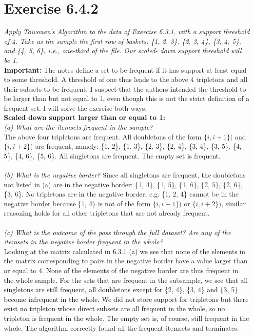 \documentclass{article}
\begin{document}
\section*{Exercise 6.4.2}
\textit{Apply Toivonen’s Algorithm to the data of Exercise 6.3.1,
with a support threshold of 4. Take as the sample the first row of baskets:
\{1, 2, 3\}, \{2, 3, 4\}, \{3, 4, 5\}, and \{4, 5, 6\}, i.e., one-third of the file. Our scaled-
down support threshold will be 1.}
\\
\textbf{Important:} The notes define a set to be frequent if it has support at least equal to some threshold. A threshold of one thus leads to the above 4 tripletons and all their subsets to be frequent.
I suspect that the authors intended the threshold to be larger than but not equal to 1, even though this is not the strict definition of a frequent set. I will solve the exercise both ways.
\\
\textbf{Scaled down support larger than or equal to 1:}
\\
\textit{(a) What are the itemsets frequent in the sample?}
\\
The above four tripletons are frequent. All doubletons of the form $\{i,i+1\})$ and $\{i,i+2\})$ are frequent, namely: \{1, 2\}, \{1, 3\}, \{2, 3\}, \{2, 4\}, \{3, 4\}, \{3, 5\}, \{4, 5\}, \{4, 6\}, \{5, 6\}.
All singletons are frequent. The empty set is frequent.
\\
\\
\textit{(b) What is the negative border?}
Since all singletons are frequent, the doubletons not listed in (a) are in the negative border:
\{1, 4\}, \{1, 5\}, \{1, 6\}, \{2, 5\}, \{2, 6\}, \{3, 6\}.
No tripletons are in the negative border, e.g. \{1, 2, 4\} cannot be in the negative border because
\{1, 4\} is not of the form $\{i,i+1\})$ or $\{i,i+2\})$, similar reasoning holds for all other tripletons that are not already frequent.
\\
\\
\textit{(c) What is the outcome of the pass through the full dataset? Are any of the
itemsets in the negative border frequent in the whole?}
\\
Looking at the matrix calculated in 6.3.1 (a) we see that none of the elements in the matrix corresponding to pairs in the negative border have a value larger than or equal to 4. None of the elements of the negative border are thus frequent in the whole sample. For the sets that are frequent in the subsample, we see that all singletons are still frequent, all doubletons except for 
\{2, 4\}, \{3, 4\} and \{3, 5\} become infrequent in the whole. We did not store support for tripletons but there exist no tripleton whose direct subsets are all frequent in the whole, so no tripleton is frequent in the whole. The empty set is, of course, still frequent in the whole. The algorithm correctly found all the frequent itemsets and terminates.
\end{document}
